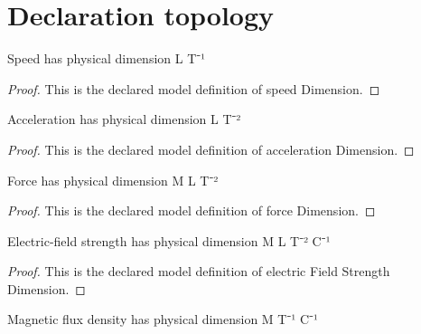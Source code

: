 \section{Declaration topology}
\begin{definition}
  \label{def:physics:phyx-mini-0927:phyxminiproblems-problemphyxmini0927-speeddimension}
  Speed has physical dimension L T⁻¹
\end{definition}
\begin{proof}
  This is the declared model definition of speed Dimension.
\end{proof}
\begin{definition}
  \label{def:physics:phyx-mini-0927:phyxminiproblems-problemphyxmini0927-accelerationdimension}
  Acceleration has physical dimension L T⁻²
\end{definition}
\begin{proof}
  This is the declared model definition of acceleration Dimension.
\end{proof}
\begin{definition}
  \label{def:physics:phyx-mini-0927:phyxminiproblems-problemphyxmini0927-forcedimension}
  Force has physical dimension M L T⁻²
\end{definition}
\begin{proof}
  This is the declared model definition of force Dimension.
\end{proof}
\begin{definition}
  \label{def:physics:phyx-mini-0927:phyxminiproblems-problemphyxmini0927-electricfieldstrengthdimension}
  Electric-field strength has physical dimension M L T⁻² C⁻¹
\end{definition}
\begin{proof}
  This is the declared model definition of electric Field Strength Dimension.
\end{proof}
\begin{definition}
  \label{def:physics:phyx-mini-0927:phyxminiproblems-problemphyxmini0927-magneticfluxdensitydimension}
  Magnetic flux density has physical dimension M T⁻¹ C⁻¹
\end{definition}
